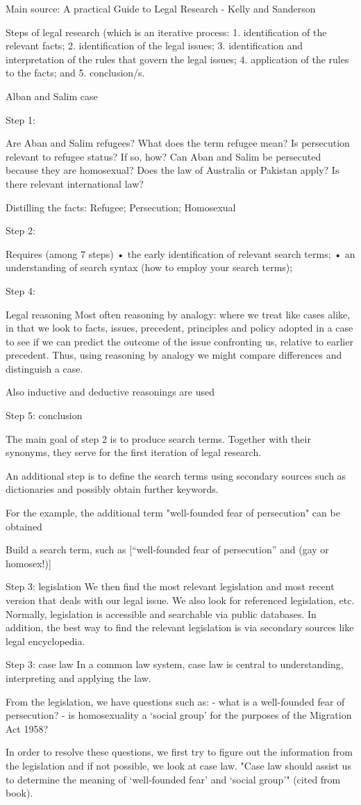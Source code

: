 Main source: A practical Guide to Legal Research - Kelly and Sanderson

Steps of legal research (which is an iterative process:
1. identification of the relevant facts;
2. identification of the legal issues;
3. identification and interpretation of the rules that govern the legal issues;
4. application of the rules to the facts; and
5. conclusion/s.

Alban and Salim case

Step 1:

Are Aban and Salim refugees? What does the term refugee mean?
Is persecution relevant to refugee status? If so, how?
Can Aban and Salim be persecuted because they are homosexual?
Does the law of Australia or Pakistan apply?
Is there relevant international law?

Distilling the facts: Refugee; Persecution; Homosexual

Step 2:

Requires (among 7 steps)
• the early identification of relevant search terms;
• an understanding of search syntax (how to employ your search terms);

Step 4:

Legal reasoning
Most often reasoning by analogy: where we treat like cases alike, in that we look to facts, issues, precedent, principles and policy adopted in a case to see if we can predict the outcome of the issue confronting us, relative to earlier precedent. Thus, using reasoning by analogy we might compare differences and distinguish a case.

Also inductive and deductive reasonings are used

Step 5: conclusion

The main goal of step 2 is to produce search terms. Together with their synonyms, they serve for the first iteration of legal research.

An additional step is to define the search terms using secondary sources such as dictionaries and possibly obtain further keywords.

For the example, the additional term "well-founded fear of persecution" can be obtained

Build a search term, such as [“well-founded fear of persecution” and (gay or homosex!)]

Step 3: legislation
We then find the most relevant legislation and most recent version that deals with our legal issue. We also look for referenced legislation, etc. Normally, legislation is accessible and searchable via public databases. In addition, the best way to find the relevant legislation is via secondary sources like legal encyclopedia.

Step 3: case law
In a common law system, case law is central to
understanding, interpreting and applying the law.

From the legislation, we have questions such as:
- what is a well-founded fear of persecution?
- is homosexuality a ‘social group’ for the purposes of the Migration Act 1958?

In order to resolve these questions, we first try to figure out the information from the legislation and if not possible, we look at case law. "Case law should assist us to determine the meaning of ‘well-founded fear’ and ‘social group’" (cited from book).